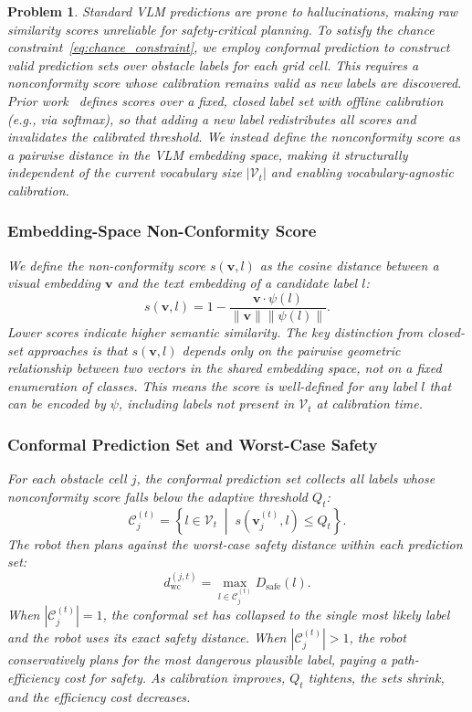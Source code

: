 \documentclass[letterpaper, 10 pt, conference]{ieeeconf}  %
\newtheorem{myprob}{\bf Problem}
\begin{document}
\begin{myprob}
Standard VLM predictions are prone to hallucinations, making raw similarity scores unreliable for safety-critical planning. To satisfy the chance constraint~\eqref{eq:chance_constraint}, we employ conformal prediction to construct valid prediction sets over obstacle labels for each grid cell. This requires a nonconformity score whose calibration remains valid as new labels are discovered. Prior work~\cite{sundarsingh2026safeplanningunknownenvironments} defines scores over a \textit{fixed, closed} label set with \textit{offline} calibration (e.g., via softmax), so that adding a new label redistributes all scores and invalidates the calibrated threshold. We instead define the nonconformity score as a \textit{pairwise} distance in the VLM embedding space, making it structurally independent of the current vocabulary size $|\mathcal{V}_t|$ and enabling \textit{vocabulary-agnostic} calibration.

\subsubsection{Embedding-Space Non-Conformity Score}
We define the non-conformity score $s(\mathbf{v}, l)$ as the cosine distance between a visual embedding $\mathbf{v}$ and the text embedding of a candidate label $l$:
\begin{equation}
    s(\mathbf{v}, l) = 1 - \frac{\mathbf{v} \cdot \psi(l)}{\| \mathbf{v} \| \| \psi(l) \|}.
    \label{eq:nonconf}
\end{equation}
Lower scores indicate higher semantic similarity. The key distinction from closed-set approaches is that $s(\mathbf{v}, l)$ depends only on the pairwise geometric relationship between two vectors in the shared embedding space, not on a fixed enumeration of classes. This means the score is well-defined for \textit{any} label $l$ that can be encoded by $\psi$, including labels not present in $\mathcal{V}_t$ at calibration time.

\subsubsection{Conformal Prediction Set and Worst-Case Safety}
For each obstacle cell $j$, the conformal prediction set collects all labels whose nonconformity score falls below the adaptive threshold $Q_t$:
\begin{equation}
    \mathcal{C}_j^{(t)} = \left\{ l \in \mathcal{V}_t \;\middle|\; s(\mathbf{v}_j^{(t)}, l) \le Q_t \right\}.
    \label{eq:conf_set}
\end{equation}
The robot then plans against the worst-case safety distance within each prediction set:
\begin{equation}
    d_{\text{wc}}^{(j, t)} = \max_{l \in \mathcal{C}_j^{(t)}} D_{\text{safe}}(l).
    \label{eq:wc_dist}
\end{equation}
When $|\mathcal{C}_j^{(t)}| = 1$, the conformal set has collapsed to the single most likely label and the robot uses its exact safety distance. When $|\mathcal{C}_j^{(t)}| > 1$, the robot conservatively plans for the most dangerous plausible label, paying a path-efficiency cost for safety. As calibration improves, $Q_t$ tightens, the sets shrink, and the efficiency cost decreases.


\end{myprob}
\end{document}
